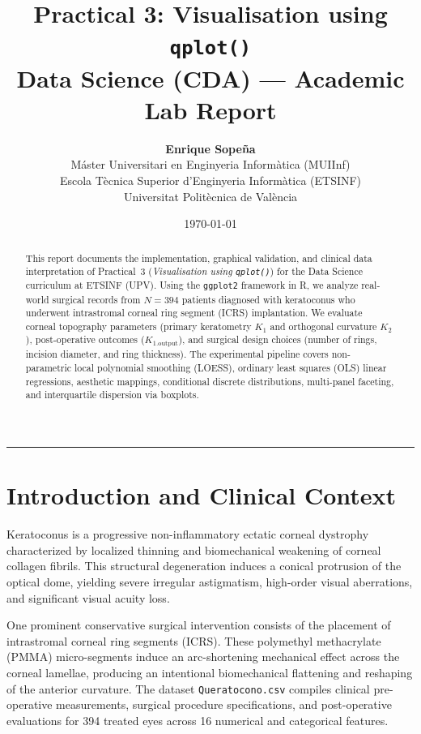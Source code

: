 \documentclass[11pt,a4paper]{article}
\title{\textbf{Practical 3: Visualisation using \texttt{qplot()}}\\[0.4ex] \Large Data Science (CDA) --- Academic Lab Report}
\author{\textbf{Enrique Sopeña} \\ 
Máster Universitari en Enginyeria Informàtica (MUIInf) \\
Escola Tècnica Superior d'Enginyeria Informàtica (ETSINF) \\ 
Universitat Politècnica de València}
\date{\today}
\begin{document}
\maketitle

\begin{abstract}
  This report documents the implementation, graphical validation, and clinical data interpretation of Practical~3 (\textit{Visualisation using \texttt{qplot()}}) for the Data Science curriculum at ETSINF (UPV). Using the \texttt{ggplot2} framework in R, we analyze real-world surgical records from $N=394$ patients diagnosed with keratoconus who underwent intrastromal corneal ring segment (ICRS) implantation. We evaluate corneal topography parameters (primary keratometry $K_1$ and orthogonal curvature $K_2$), post-operative outcomes ($K_{1.\text{output}}$), and surgical design choices (number of rings, incision diameter, and ring thickness). The experimental pipeline covers non-parametric local polynomial smoothing (LOESS), ordinary least squares (OLS) linear regressions, aesthetic mappings, conditional discrete distributions, multi-panel faceting, and interquartile dispersion via boxplots.
\end{abstract}

\vspace{0.8em}
\hrule
\vspace{1em}

\section{Introduction and Clinical Context}
Keratoconus is a progressive non-inflammatory ectatic corneal dystrophy characterized by localized thinning and biomechanical weakening of corneal collagen fibrils. This structural degeneration induces a conical protrusion of the optical dome, yielding severe irregular astigmatism, high-order visual aberrations, and significant visual acuity loss.

One prominent conservative surgical intervention consists of the placement of intrastromal corneal ring segments (ICRS). These polymethyl methacrylate (PMMA) micro-segments induce an arc-shortening mechanical effect across the corneal lamellae, producing an intentional biomechanical flattening and reshaping of the anterior curvature. The dataset \texttt{Queratocono.csv} compiles clinical pre-operative measurements, surgical procedure specifications, and post-operative evaluations for 394 treated eyes across 16 numerical and categorical features.
\end{document}
